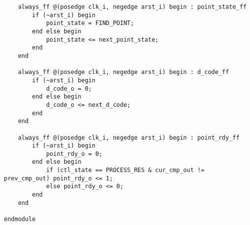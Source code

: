 \begin{lstlisting}
	always_ff @(posedge clk_i, negedge arst_i) begin : point_state_ff
		if (~arst_i) begin
			point_state = FIND_POINT;
		end else begin
			point_state <= next_point_state;
		end
	end

	always_ff @(posedge clk_i, negedge arst_i) begin : d_code_ff
		if (~arst_i) begin
			d_code_o = 0;
		end else begin
			d_code_o <= next_d_code;
		end
	end

	always_ff @(posedge clk_i, negedge arst_i) begin : point_rdy_ff
		if (~arst_i) begin
			point_rdy_o = 0;
		end else begin
			if (ctl_state == PROCESS_RES & cur_cmp_out != prev_cmp_out) point_rdy_o <= 1;
			else point_rdy_o <= 0;
		end
	end

endmodule
\end{lstlisting}




\NewPage %
